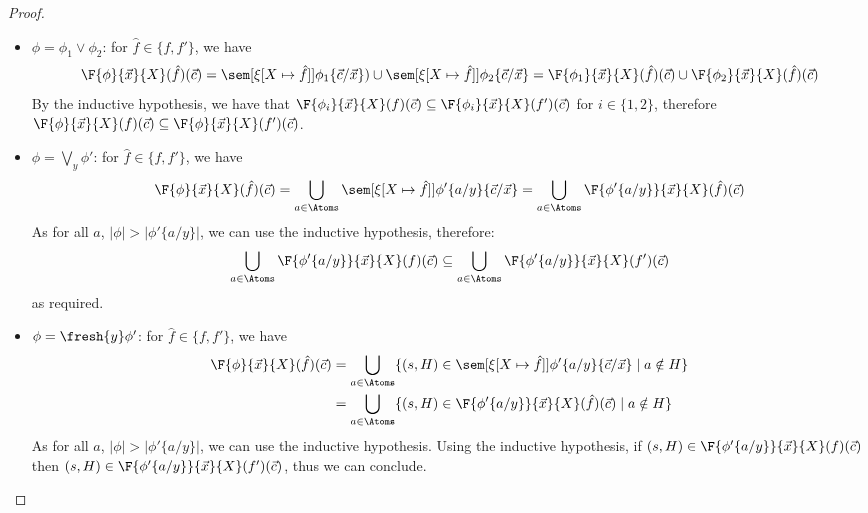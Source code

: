 \begin{proof}
\begin{itemize}
\begin{align*}
		\end{align*}
		By the inductive hypothesis, we have that $\F{\phi'}{\vec x}{X}(f) \sqsupseteq \F{\phi'}{\vec x}{X}(f')$, meaning for all $\vec c \in \Atoms^{|\vec x|}$, we have that
		\begin{align*}
			\gap\F{\phi'}{\vec x}{X}(f)(\vec c) \supseteq \F{\phi'}{\vec x}{X}(f')(\vec c) \\
			\therefore\gap\F{\phi}{\vec x}{X}(f)(\vec c) \subseteq \F{\phi}{\vec x}{X}(f')(\vec c)
		\end{align*}
		as required.
		Note we use the second inductive hypothesis as $\lnot \phi'$ has one more negation than $\phi'$.
		\item $\phi = \phi_1 \lor \phi_2$: for $\hat f \in \{f, f'\}$, we have
		\[
		\F{\phi}{\vec x}{X}(\hat f)(\vec c) = \sem[{\xi[X\mapsto \hat f]}]{\phi_1\{\vec c / \vec x\})} \cup \sem[{\xi[X\mapsto \hat f]}]{\phi_2\{\vec c / \vec x\}} = \F{\phi_1}{\vec x}{X}(\hat f)(\vec c) \cup \F{\phi_2}{\vec x}{X}(\hat f)(\vec c)
		\]
		By the inductive hypothesis, we have that $\F{\phi_i}{\vec x}{X}(f)(\vec c) \subseteq \F{\phi_i}{\vec x}{X}(f')(\vec c)$ for $i \in \{1,2\}$,
		therefore
		$\F{\phi}{\vec x}{X}(f)(\vec c)\subseteq \F{\phi}{\vec x}{X}(f')(\vec c)$.
		\item $\phi = \bigvee_{y} \phi'$: for $\hat f \in \{f,f'\}$, we have
		\[
		\F{\phi}{\vec x}{X}(\hat f)(\vec c) = \bigcup_{a\in \Atoms}\sem[{\xi[X\mapsto \hat f]}]{\phi'\{a/y\}\{\vec c / \vec x\}} = \bigcup_{a \in \Atoms}\F{\phi'\{a/y\}}{\vec x}{X}(\hat f)(\vec c)
		\]
		As for all $a$, $|\phi| > |\phi'\{a/y\}|$, we can use the inductive hypothesis, therefore:    \[
		\bigcup_{a \in \Atoms}\F{\phi'\{a/y\}}{\vec x}{X}(f)(\vec c) \subseteq  \bigcup_{a \in \Atoms}\F{\phi'\{a/y\}}{\vec x}{X}(f')(\vec c)
		\]
		as required.
	    \item $\phi = \fresh{y} \phi'$: for $\hat f \in \{f,f'\}$, we have
		\begin{align*}
			\F{\phi}{\vec x}{X}(\hat f)(\vec c) &= \bigcup_{a\in \Atoms}\{(s, H) \in \sem[{\xi[X\mapsto \hat f]}]{\phi'\{a/y\}\{\vec c/\vec x\}} \mid a \notin H\} 
			\\ &= \bigcup_{a \in \Atoms}\{(s, H) \in \F{\phi'\{a/y\}}{\vec x}{X}(\hat f)(\vec c) \mid a \notin H\}
		\end{align*}
		As for all $a$, $|\phi| > |\phi'\{a/y\}|$, we can use the inductive hypothesis.
		Using the inductive hypothesis, if $(s, H) \in \F{\phi'\{a/y\}}{\vec x}{X}(f)(\vec c)$ then $(s, H) \in \F{\phi'\{a/y\}}{\vec x}{X}(f')(\vec c)$, thus we can conclude.

\end{itemize}
\end{proof}
